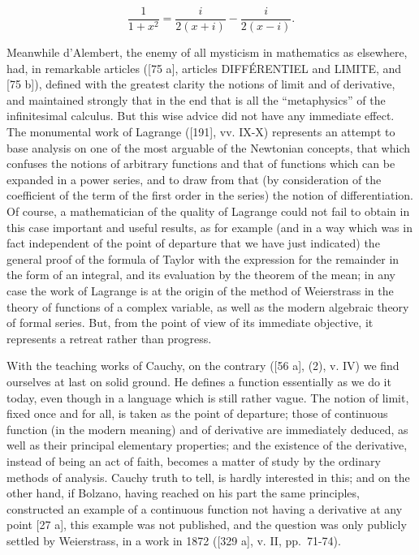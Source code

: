 \[
\frac {1}{1 + x ^ {2}} = \frac {i}{2 (x + i)} - \frac {i}{2 (x - i)}.
\]

Meanwhile d'Alembert, the enemy of all mysticism in mathematics as elsewhere, had, in remarkable articles ({[}75 a{]}, articles DIFFÉRENTIEL and LIMITE, and {[}75 b{]}), defined with the greatest clarity the notions of limit and of derivative, and maintained strongly that in the end that is all the ``metaphysics'' of the infinitesimal calculus. But this wise advice did not have any immediate effect. The monumental work of Lagrange ({[}191{]}, vv. IX-X) represents an attempt to base analysis on one of the most arguable of the Newtonian concepts, that which confuses the notions of arbitrary functions and that of functions which can be expanded in a power series, and to draw from that (by consideration of the coefficient of the term of the first order in the series) the notion of differentiation. Of course, a mathematician of the quality of Lagrange could not fail to obtain in this case important and useful results, as for example (and in a way which was in fact independent of the point of departure that we have just indicated) the general proof of the formula of Taylor with the expression for the remainder in the form of an integral, and its evaluation by the theorem of the mean; in any case the work of Lagrange is at the origin of the method of Weierstrass in the theory of functions of a complex variable, as well as the modern algebraic theory of formal series. But, from the point of view of its immediate objective, it represents a retreat rather than progress.

With the teaching works of Cauchy, on the contrary ({[}56 a{]}, (2), v. IV) we find ourselves at last on solid ground. He defines a function essentially as we do it today, even though in a language which is still rather vague. The notion of limit, fixed once and for all, is taken as the point of departure; those of continuous function (in the modern meaning) and of derivative are immediately deduced, as well as their principal elementary properties; and the existence of the derivative, instead of being an act of faith, becomes a matter of study by the ordinary methods of analysis. Cauchy truth to tell, is hardly interested in this; and on the other hand, if Bolzano, having reached on his part the same principles, constructed an example of a continuous function not having a derivative at any point {[}27 a{]}, this example was not published, and the question was only publicly settled by Weierstrass, in a work in 1872 ({[}329 a{]}, v. II, pp.~71-74).

